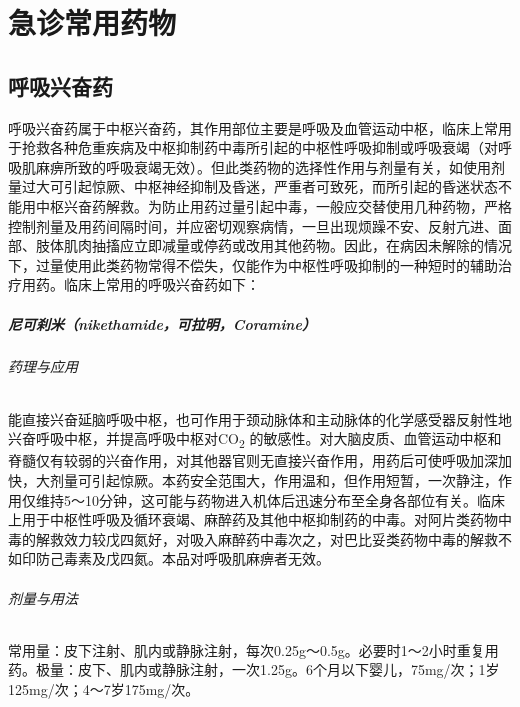\part{急诊常用药物}

\chapter{呼吸兴奋药}

呼吸兴奋药属于中枢兴奋药，其作用部位主要是呼吸及血管运动中枢，临床上常用于抢救各种危重疾病及中枢抑制药中毒所引起的中枢性呼吸抑制或呼吸衰竭（对呼吸肌麻痹所致的呼吸衰竭无效）。但此类药物的选择性作用与剂量有关，如使用剂量过大可引起惊厥、中枢神经抑制及昏迷，严重者可致死，而所引起的昏迷状态不能用中枢兴奋药解救。为防止用药过量引起中毒，一般应交替使用几种药物，严格控制剂量及用药间隔时间，并应密切观察病情，一旦出现烦躁不安、反射亢进、面部、肢体肌肉抽搐应立即减量或停药或改用其他药物。因此，在病因未解除的情况下，过量使用此类药物常得不偿失，仅能作为中枢性呼吸抑制的一种短时的辅助治疗用药。临床上常用的呼吸兴奋药如下：

\subsubsection{尼可刹米（nikethamide，可拉明，Coramine）}

\paragraph{药理与应用}

能直接兴奋延脑呼吸中枢，也可作用于颈动脉体和主动脉体的化学感受器反射性地兴奋呼吸中枢，并提高呼吸中枢对CO\textsubscript{2}
的敏感性。对大脑皮质、血管运动中枢和脊髓仅有较弱的兴奋作用，对其他器官则无直接兴奋作用，用药后可使呼吸加深加快，大剂量可引起惊厥。本药安全范围大，作用温和，但作用短暂，一次静注，作用仅维持5～10分钟，这可能与药物进入机体后迅速分布至全身各部位有关。临床上用于中枢性呼吸及循环衰竭、麻醉药及其他中枢抑制药的中毒。对阿片类药物中毒的解救效力较戊四氮好，对吸入麻醉药中毒次之，对巴比妥类药物中毒的解救不如印防己毒素及戊四氮。本品对呼吸肌麻痹者无效。

\paragraph{剂量与用法}

常用量：皮下注射、肌内或静脉注射，每次0.25g～0.5g。必要时1～2小时重复用药。极量：皮下、肌内或静脉注射，一次1.25g。6个月以下婴儿，75mg/次；1岁125mg/次；4～7岁175mg/次。

